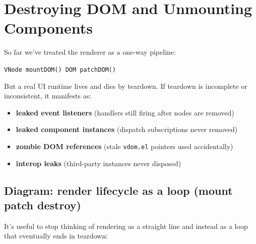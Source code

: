 \chapter{Destroying DOM and Unmounting Components}

So far we've treated the renderer as a one-way pipeline:

\begin{center}
	\texttt{VNode \textrightarrow mountDOM() \textrightarrow DOM \textrightarrow patchDOM()}
\end{center}

But a real UI runtime lives and dies by teardown. If teardown is incomplete or inconsistent, it manifests as:

\begin{itemize}
  \item \textbf{leaked event listeners} (handlers still firing after nodes are removed)
  \item \textbf{leaked component instances} (dispatch subscriptions never removed)
  \item \textbf{zombie DOM references} (stale \texttt{vdom.el} pointers used accidentally)
  \item \textbf{interop leaks} (third-party instances never disposed)
\end{itemize}

\section{Diagram: render lifecycle as a loop (mount \textrightarrow patch \textrightarrow destroy)}
It's useful to stop thinking of rendering as a straight line and instead as a loop that eventually ends in teardown:

\begin{center}
\end{center}


